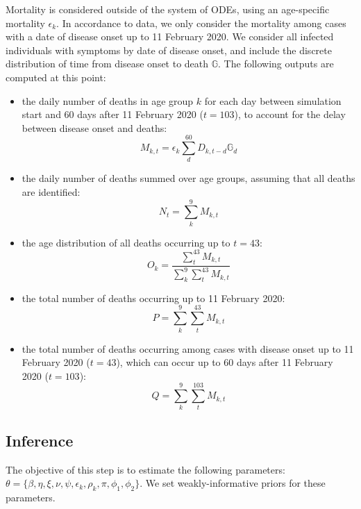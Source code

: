 \documentclass{article}
\begin{document}
	Mortality is considered outside of the system of ODEs, using an age-specific mortality $\epsilon_k$.
	In accordance to data, we only consider the mortality among cases with a date of disease onset up to 11 February 2020.
	We consider all infected individuals with symptoms by date of disease onset, and include the discrete distribution of time from disease onset to death $\mathds{G}$. The following outputs are computed at this point:
	\begin{itemize}
		\item the daily number of deaths in age group $k$ for each day between simulation start and 60 days after 11 February 2020 ($t=103$), to account for the delay between disease onset and deaths:
		\begin{equation}
		M_{k,t}= \epsilon_k\sum_d^{60}  D_{k,t-d} \mathds{G}_d 
		\end{equation}
		\item the daily number of deaths summed over age groups, assuming that all deaths are identified:
		\begin{equation}
		N_{t}= \sum_k^9 M_{k,t}
		\end{equation}
		\item the age distribution of all deaths occurring up to $t=43$:
		\begin{equation}
		O_k = \frac{\sum_t^{43} M_{k,t}}{\sum_k^9 \sum_t^{43} M_{k,t}}
		\end{equation}
		\item the total number of deaths occurring up to 11 February 2020:
		\begin{equation}
		P = \sum_k^9 \sum_t^{43} M_{k,t}
		\end{equation}
		\item the total number of deaths occurring among cases with disease onset up to 11 February 2020 ($t=43$), which can occur up to 60 days after 11 February 2020 ($t=103$):
		\begin{equation}
		Q = \sum_k^9 \sum_t^{103} M_{k,t}
		\end{equation}
	\end{itemize}
	
	\subsection{Inference}
	
	The objective of this step is to estimate the following parameters: $\theta=\{\beta, \eta, \xi, \nu, \psi, \epsilon_k, \rho_k, \pi,  \phi_1, \phi_2 \}$.
	We set weakly-informative priors for these parameters.
	
\end{document}

